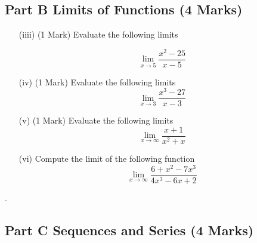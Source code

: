 \documentclass[11pt]{article} %
\begin{document}
\subsection*{Part B Limits of Functions (4 Marks)}


\begin{itemize}
\item[(iiii)](1 Mark)
Evaluate the following limits

\[\lim_{x \to 5 } \frac{x^2-25}{x-5}\]  %
\vspace{2cm}
\item[(iv)](1 Mark)
Evaluate the following limits
\[  \lim_{x\to 3} \frac{x^3-27}{x-3}      \]


\end{itemize}




%
%

\newpage

\begin{enumerate}
%	
%	
	\item[(v)](1 Mark)
	Evaluate the following limits
	\[  \lim_{x\to \infty } \frac{x+1}{x^2+x}      \] \vspace{2cm}
	\item[(vi)]  Compute the limit of the following function
	\[ \lim_{x \to \infty } \frac{6 + x^2 - 7x^3 }{4x^3 - 6x + 2} \]	
	
\end{enumerate}
\newpage
.
\newpage
\subsection*{Part C Sequences and Series (4 Marks)}
\end{document}
